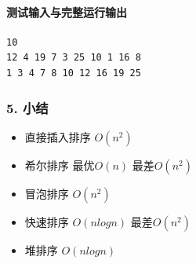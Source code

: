 \documentclass{ctexart}
\begin{document}
\paragraph{测试输入与完整运行输出}
\begin{verbatim}
10
12 4 19 7 3 25 10 1 16 8 
1 3 4 7 8 10 12 16 19 25 
\end{verbatim}
\subsubsection{5. 小结}
\begin{itemize}
    \item 直接插入排序 $O(n^2)$ 
    \item 希尔排序 最优$O(n)$ 最差$O(n^2)$
    \item 冒泡排序 $O(n^2)$
    \item 快速排序 $O(nlogn)$ 最差$O(n^2)$
    \item 堆排序 $O(nlogn)$
\end{itemize}
\end{document}

